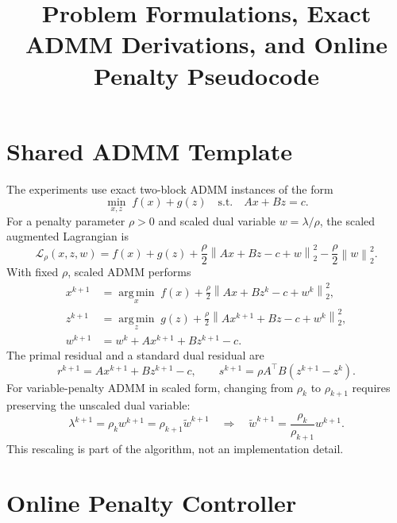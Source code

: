 \documentclass[11pt]{article}
\title{Problem Formulations, Exact ADMM Derivations, and Online Penalty Pseudocode}
\author{}
\date{}
\newcommand{\argmin}{\operatorname*{arg\,min}}
\newcommand{\norm}[1]{\left\lVert #1 \right\rVert}
\begin{document}
\maketitle

\section{Shared ADMM Template}

The experiments use exact two-block ADMM instances of the form
\begin{equation}
    \min_{x,z}\; f(x) + g(z)
    \quad \text{s.t.} \quad
    Ax + Bz = c .
    \label{eq:generic-problem}
\end{equation}
For a penalty parameter $\rho>0$ and scaled dual variable $w=\lambda/\rho$,
the scaled augmented Lagrangian is
\begin{equation}
    \mathcal{L}_{\rho}(x,z,w)
    =
    f(x)+g(z)
    + \frac{\rho}{2}\norm{Ax+Bz-c+w}_2^2
    - \frac{\rho}{2}\norm{w}_2^2 .
\end{equation}
With fixed $\rho$, scaled ADMM performs
\begin{align}
    x^{k+1}
    &=
    \argmin_x\;
    f(x)
    + \frac{\rho}{2}
      \norm{Ax+Bz^k-c+w^k}_2^2, \\
    z^{k+1}
    &=
    \argmin_z\;
    g(z)
    + \frac{\rho}{2}
      \norm{Ax^{k+1}+Bz-c+w^k}_2^2, \\
    w^{k+1}
    &=
    w^k + Ax^{k+1}+Bz^{k+1}-c .
\end{align}
The primal residual and a standard dual residual are
\begin{equation}
    r^{k+1}=Ax^{k+1}+Bz^{k+1}-c,
    \qquad
    s^{k+1}=\rho A^\top B(z^{k+1}-z^k).
\end{equation}
For variable-penalty ADMM in scaled form, changing from $\rho_k$ to
$\rho_{k+1}$ requires preserving the unscaled dual variable:
\begin{equation}
    \lambda^{k+1}=\rho_k w^{k+1}
    =
    \rho_{k+1}\widetilde{w}^{k+1}
    \quad \Longrightarrow \quad
    \widetilde{w}^{k+1}
    =
    \frac{\rho_k}{\rho_{k+1}} w^{k+1}.
    \label{eq:scaled-dual-rescale}
\end{equation}
This rescaling is part of the algorithm, not an implementation detail.

\section{Online Penalty Controller}
\end{document}
